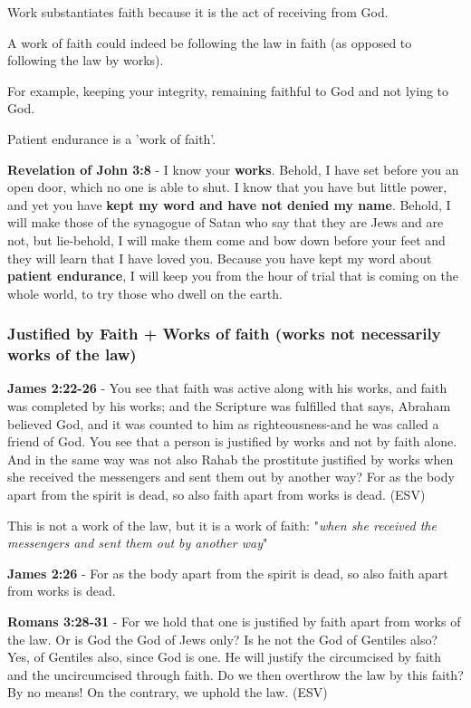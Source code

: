 \documentclass[11pt]{article}
\begin{document}
Work substantiates faith because it is the act of receiving from God.

A work of faith could indeed be following the law in faith (as opposed to following the law by works).

For example, keeping your integrity, remaining faithful to God and not lying to God.

Patient endurance is a 'work of faith'.

\textbf{Revelation of John 3:8} - I know your \textbf{works}. Behold, I have set before you an open door, which no one is able to shut. I know that you have but little power, and yet you have \textbf{kept my word and have not denied my name}.  Behold, I will make those of the synagogue of Satan who say that they are Jews and are not, but lie-behold, I will make them come and bow down before your feet and they will learn that I have loved you.  Because you have kept my word about \textbf{patient endurance}, I will keep you from the hour of trial that is coming on the whole world, to try those who dwell on the earth.

\subsubsection{Justified by Faith + Works of faith (works not necessarily works of the law)}
\label{sec:org44a5e2a}
\textbf{James 2:22-26} - You see that faith was active along with his works, and faith was completed by his works; and the Scripture was fulfilled that says, Abraham believed God, and it was counted to him as righteousness-and he was called a friend of God. You see that a person is justified by works and not by faith alone. And in the same way was not also Rahab the prostitute justified by works when she received the messengers and sent them out by another way? For as the body apart from the spirit is dead, so also faith apart from works is dead. (ESV)

This is not a work of the law, but it is a work of faith: "\emph{when she received the messengers and sent them out by another way}"

\textbf{James 2:26} - For as the body apart from the spirit is dead, so also faith apart from works is dead.

\textbf{Romans 3:28-31} - For we hold that one is justified by faith apart from works of the law. Or is God the God of Jews only? Is he not the God of Gentiles also? Yes, of Gentiles also, since God is one. He will justify the circumcised by faith and the uncircumcised through faith. Do we then overthrow the law by this faith? By no means! On the contrary, we uphold the law. (ESV)
\end{document}
